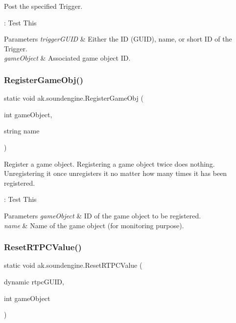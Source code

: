 Post the specified Trigger. 

\+: Test This


\begin{DoxyParams}{Parameters}
{\em trigger\+G\+U\+ID} & Either the ID (G\+U\+ID), name, or short ID of the Trigger.\\
\hline
{\em game\+Object} & Associated game object ID.\\
\hline
\end{DoxyParams}
\mbox{\label{classak_1_1soundengine_a3fd88cbe63fb08f7e42e55cf5545d0ea}} 
\subsubsection{\texorpdfstring{Register\+Game\+Obj()}{RegisterGameObj()}}
{\footnotesize\ttfamily static void ak.\+soundengine.\+Register\+Game\+Obj (\begin{DoxyParamCaption}\item[{int}]{game\+Object,  }\item[{string}]{name }\end{DoxyParamCaption})\hspace{0.3cm}{\ttfamily [static]}}



Register a game object. Registering a game object twice does nothing. Unregistering it once unregisters it no matter how many times it has been registered. 

\+: Test This


\begin{DoxyParams}{Parameters}
{\em game\+Object} & ID of the game object to be registered.\\
\hline
{\em name} & Name of the game object (for monitoring purpose).\\
\hline
\end{DoxyParams}
\mbox{\label{classak_1_1soundengine_afc2a12c76050e0525a056ec67add7743}} 
\subsubsection{\texorpdfstring{Reset\+R\+T\+P\+C\+Value()}{ResetRTPCValue()}}
{\footnotesize\ttfamily static void ak.\+soundengine.\+Reset\+R\+T\+P\+C\+Value (\begin{DoxyParamCaption}\item[{dynamic}]{rtpc\+G\+U\+ID,  }\item[{int}]{game\+Object }\end{DoxyParamCaption})\hspace{0.3cm}{\ttfamily [static]}}



